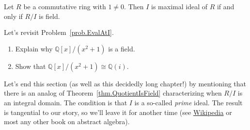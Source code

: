 \begin{theorem}\label{thm.QuotientIsField}
Let $R$ be a commutative ring with $1\neq0$. Then $I$ is maximal ideal of $R$ if and only if $R/I$ is field.
\end{theorem}

\begin{problem}
Let's revisit Problem~\ref{prob.EvalAtI}.
\begin{enumerate}
\item Explain why $\mathbb{Q}[x]/(x^2+1)$ is a field.
\item Show that $\mathbb{Q}[x]/(x^2+1) \cong \mathbb{Q}(i)$.
\end{enumerate}
\end{problem}

Let's end this section (as well as this decidedly long chapter!) by mentioning that there is an analog of Theorem~\ref{thm.QuotientIsField} characterizing when $R/I$ is an integral domain. The condition is that $I$ is a so-called \textit{prime} ideal. The result is tangential to our story, so we'll leave it for another time (see \href{https://en.wikipedia.org/wiki/Prime_ideal#Connection_to_maximality}{Wikipedia} or most any other book on abstract algebra).




